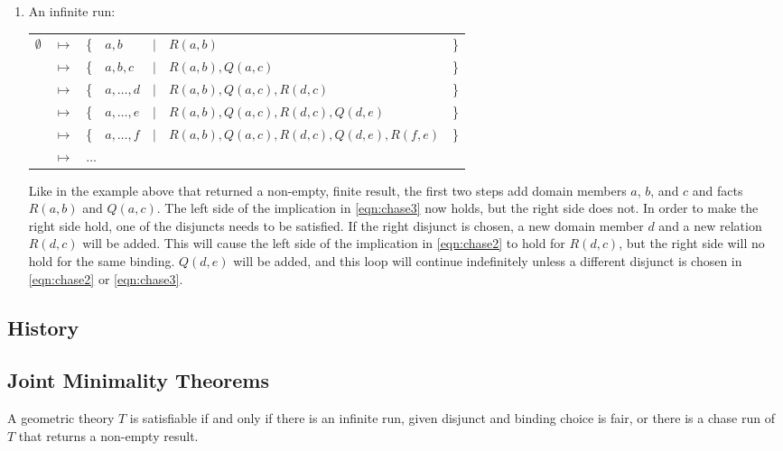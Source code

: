 \begin{enumerate}
		\item An infinite run:

			\begin{tabular}{lllllll}
				$\emptyset$ & $\mapsto$ & \{ & $a,b$        & $|$ & $R(a,b)$                                 & \} \\
				{}          & $\mapsto$ & \{ & $a,b,c$      & $|$ & $R(a,b), Q(a,c)$                         & \} \\
				{}          & $\mapsto$ & \{ & $a,\ldots,d$ & $|$ & $R(a,b), Q(a,c), R(d,c)$                 & \} \\
				{}          & $\mapsto$ & \{ & $a,\ldots,e$ & $|$ & $R(a,b), Q(a,c), R(d,c), Q(d,e)$         & \} \\
				{}          & $\mapsto$ & \{ & $a,\ldots,f$ & $|$ & $R(a,b), Q(a,c), R(d,c), Q(d,e), R(f,e)$ & \} \\
				{}          & $\mapsto$ & \multicolumn{5}{l}{ $\ldots$ }
			\end{tabular}

			Like in the example above that returned a non-empty, finite result,
			the first two steps add domain members $a$, $b$, and $c$ and facts
			$R(a,b)$ and $Q(a,c)$. The left side of the implication in
			\eqref{eqn:chase3} now holds, but the right side does not. In order to
			make the right side hold, one of the disjuncts needs to be
			satisfied. If the right disjunct is chosen, a new domain member $d$
			and a new relation $R(d,c)$ will be added. This will cause the
			left side of the implication in \eqref{eqn:chase2} to hold for $R(d,c)$,
			but the right side will no hold for the same binding. $Q(d,e)$ will
			be added, and this loop will continue indefinitely unless a
			different disjunct is chosen in \eqref{eqn:chase2} or \eqref{eqn:chase3}.

		\end{enumerate}

	\subsection{History}

		

	\subsection{Joint Minimality Theorems}

		\newtheorem{minimality-theorems}{Theorem}

		\begin{theorem}
			A geometric theory $T$ is satisfiable if and only if there is an
			infinite run, given disjunct and binding choice is fair, or there
			is a chase run of $T$ that returns a non-empty result.
		\end{theorem}

